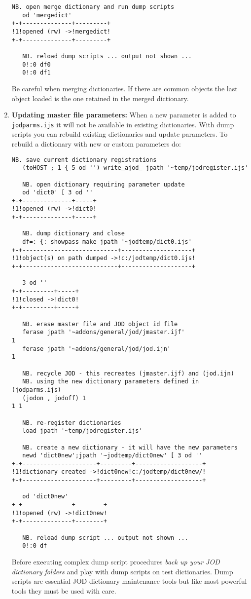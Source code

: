 \begin{enumerate}
\begin{lstlisting}[language=jdoc, frame=single,framerule=0pt,label=lst:scr5077X3]
   NB. open merge dictionary and run dump scripts   
   od 'mergedict'
+-+--------------+---------+
!1!opened (rw) ->!mergedict!
+-+--------------+---------+

   NB. reload dump scripts ... output not shown ...     
   0!:0 df0     
   0!:0 df1
\end{lstlisting}

  Be careful when merging dictionaries. If there are common objects the
  last object loaded is the one retained in the merged dictionary.
\item
  \textbf{Updating master file parameters:} When a new parameter is
  added to \texttt{jodparms.ijs} it will not be available in existing
  dictionaries. With dump scripts you can rebuild existing dictionaries
  and update parameters. To rebuild a dictionary with new or custom
  parameters do:

\begin{lstlisting}[language=jdoc, frame=single,framerule=0pt,label=lst:scr5077X4]
   NB. save current dictionary registrations   
   (toHOST ; 1 { 5 od '') write_ajod_ jpath '~temp/jodregister.ijs'

   NB. open dictionary requiring parameter update    
   od 'dict0' [ 3 od ''
+-+--------------+-----+
!1!opened (rw) ->!dict0!
+-+--------------+-----+

   NB. dump dictionary and close   
   df=: {: showpass make jpath '~jodtemp/dict0.ijs'
+-+---------------------------+--------------------+
!1!object(s) on path dumped ->!c:/jodtemp/dict0.ijs!
+-+---------------------------+--------------------+

   3 od ''
+-+---------+-----+
!1!closed ->!dict0!
+-+---------+-----+

   NB. erase master file and JOD object id file   
   ferase jpath '~addons/general/jod/jmaster.ijf'
1   
   ferase jpath '~addons/general/jod/jod.ijn'
1

   NB. recycle JOD - this recreates (jmaster.ijf) and (jod.ijn)    
   NB. using the new dictionary parameters defined in (jodparms.ijs)      
   (jodon , jodoff) 1
1 1

   NB. re-register dictionaries   
   load jpath '~temp/jodregister.ijs'

   NB. create a new dictionary - it will have the new parameters   
   newd 'dict0new';jpath '~jodtemp/dict0new' [ 3 od ''
+-+---------------------+---------+-------------------+
!1!dictionary created ->!dict0new!c:/jodtemp/dict0new/!
+-+---------------------+---------+-------------------+

   od 'dict0new'
+-+--------------+--------+
!1!opened (rw) ->!dict0new!
+-+--------------+--------+

   NB. reload dump script ... output not shown ...   
   0!:0 df  
\end{lstlisting}

  Before executing complex dump script procedures \emph{back up your JOD
  dictionary folders} and play with dump scripts on test dictionaries.
  Dump scripts are essential JOD dictionary maintenance tools but like
  most powerful tools they must be used with care.
  
\end{enumerate}
